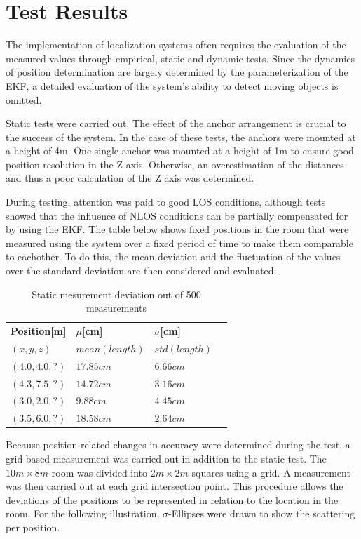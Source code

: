 \documentclass[conference, a4paper]{IEEEtran}
\begin{document}
\section{Test Results}\label{section:tests}
The implementation of localization systems often requires the evaluation of the measured values through empirical,
static and dynamic tests.
Since the dynamics of position determination are largely determined by the parameterization of the \ac{EKF},
a detailed evaluation of the system's ability to detect moving objects is omitted.

Static tests were carried out.
The effect of the anchor arrangement is crucial to the success of the system.
In the case of these tests, the anchors were mounted at a height of 4m.
One single anchor was mounted at a height of 1m to ensure good position resolution in the Z axis.
Otherwise, an overestimation of the distances and thus a poor calculation of the Z axis was determined.

During testing, attention was paid to good \ac{LOS} conditions,
although tests showed that the influence of \ac{NLOS} conditions can be partially compensated for by using the \ac{EKF}.
The table below shows fixed positions in the room that were measured using the system
over a fixed period of time to make them comparable to eachother.
To do this, the mean deviation and the fluctuation of the values over the standard deviation are then considered and evaluated.

\begin{table}[hbt!]
	\centering
	\begin{tabular}{l l l c}
		\toprule
		\textbf{Position[m]} & \textbf{$\mu$[cm]} & \textbf{$\sigma$[cm]}\\
		$(x,y,z)$ & $mean(length)$ & $std(length)$\\
		\midrule
		$(4.0,4.0,?)$ & $17.85cm$ & $6.66cm$\\
		$(4.3,7.5,?)$ & $14.72cm$ & $3.16cm$\\
		$(3.0,2.0,?)$ & $9.88cm$ & $4.45cm$\\
		$(3.5,6.0,?)$ & $18.58cm$ & $2.64cm$\\
		\bottomrule
	\end{tabular}
	\caption{Static mesurement deviation out of 500 measurements}
\end{table}

Because position-related changes in accuracy were determined during the test,
a grid-based measurement was carried out in addition to the static test.
The $10m\times8m$ room was divided into $2m\times2m$ squares using a grid.
A measurement was then carried out at each grid intersection point.
This procedure allows the deviations of the positions to be represented in relation to the location in the room.
For the following illustration, $\sigma$-Ellipses were drawn to show the scattering per position.
\end{document}

